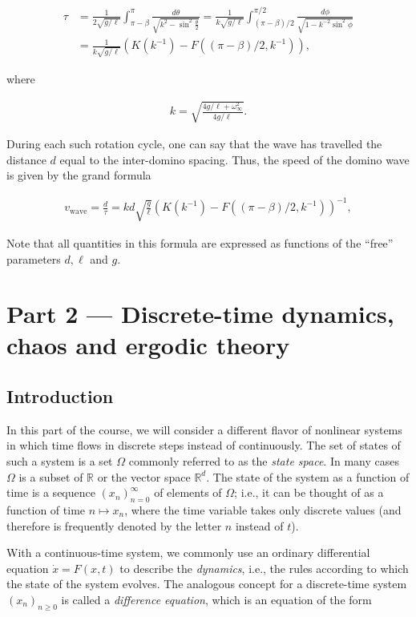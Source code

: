 \documentclass[11pt]{report}
\theoremstyle{plain}
\theoremstyle{definition}
\begin{document}
\begin{align*}
\tau &= \frac{1}{2\sqrt{g/\ell}} \int_{\pi-\beta}^{\pi} \frac{d\theta}{\sqrt{k^2-\sin^2\tfrac{\theta}{2}}}
= \frac{1}{k\sqrt{g/\ell}} \int_{(\pi-\beta)/2}^{\pi/2} \frac{d\phi}{\sqrt{1-k^{-2}\sin^2 \phi}} \\
&= \frac{1}{k\sqrt{g/\ell}} \left( K(k^{-1})-F((\pi-\beta)/2,k^{-1}) \right),
\end{align*}

\noindent where

\begin{align*}
k = \sqrt{\frac{4g/\ell+\omega_\infty^2}{4g/\ell}}.
\end{align*}

\noindent During each such rotation cycle, one can say that the
wave has travelled the distance $d$ equal to the
inter-domino spacing. Thus, the speed of the domino
wave is given by the grand formula

\begin{align*}
v_{\textrm{wave}} = \frac{d}{\tau} = k d \sqrt{\frac{g}{\ell}}
\left( K(k^{-1})-F((\pi-\beta)/2,k^{-1}) \right)^{-1},
\end{align*}

\noindent Note that all quantities in this formula are expressed
as functions of the ``free'' parameters $d, \ell$ and
$g$.

\chapter{Part 2 — Discrete-time dynamics, chaos and ergodic theory}

\section{Introduction}
\label{sec:ergodic-intro}

In this part of the course, we will consider a
different flavor of nonlinear systems in which time
flows in discrete steps instead of continuously. The
set of states of such a system is a set $\Omega$
commonly referred to as the \emph{state space}. In many
cases $\Omega$ is a subset of $\mathbb{R}$ or the
vector space $\mathbb{R}^d$. The state of the system
as a function of time is a sequence
$(x_n)_{n=0}^\infty$ of elements of $\Omega$; i.e., it
can be thought of as a function of time
$n\mapsto x_n$, where the time variable takes only
discrete values (and therefore is frequently denoted
by the letter $n$ instead of $t$).

With a continuous-time system, we commonly use an
ordinary differential equation $\dot{x}=F(x,t)$ to
describe the \emph{dynamics}, i.e., the rules according to
which the state of the system evolves. The analogous
concept for a discrete-time system $(x_n)_{n\ge 0}$ is
called a \emph{difference equation}, which is an equation
of the form
\end{document}

